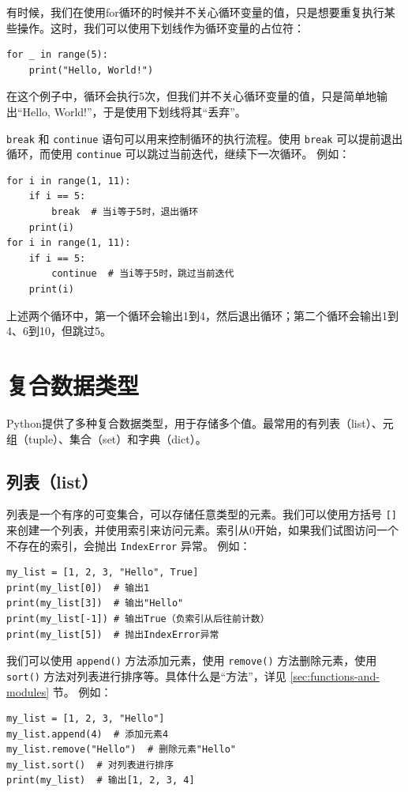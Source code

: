 有时候，我们在使用for循环的时候并不关心循环变量的值，只是想要重复执行某些操作。这时，我们可以使用下划线作为循环变量的占位符：
\begin{verbatim}
for _ in range(5):
    print("Hello, World!")
\end{verbatim}
在这个例子中，循环会执行5次，但我们并不关心循环变量的值，只是简单地输出“Hello, World!”，于是使用下划线将其“丢弃”。

 \texttt{break} 和 \texttt{continue} 语句可以用来控制循环的执行流程。使用 \texttt{break} 可以提前退出循环，而使用 \texttt{continue} 可以跳过当前迭代，继续下一次循环。
例如：
\begin{verbatim}
for i in range(1, 11):
    if i == 5:
        break  # 当i等于5时，退出循环
    print(i)
for i in range(1, 11):
    if i == 5:
        continue  # 当i等于5时，跳过当前迭代
    print(i)
\end{verbatim}
上述两个循环中，第一个循环会输出1到4，然后退出循环；第二个循环会输出1到4、6到10，但跳过5。

\section{复合数据类型}

Python提供了多种复合数据类型，用于存储多个值。最常用的有列表（list）、元组（tuple）、集合（set）和字典（dict）。

\subsection{列表（list）}
列表是一个有序的可变集合，可以存储任意类型的元素。我们可以使用方括号 \texttt{[]} 来创建一个列表，并使用索引来访问元素。索引从0开始，如果我们试图访问一个不存在的索引，会抛出 \texttt{IndexError} 异常。
例如：
\begin{verbatim}
my_list = [1, 2, 3, "Hello", True]
print(my_list[0])  # 输出1
print(my_list[3])  # 输出"Hello"
print(my_list[-1]) # 输出True（负索引从后往前计数）
print(my_list[5])  # 抛出IndexError异常
\end{verbatim}

我们可以使用 \texttt{append()} 方法添加元素，使用 \texttt{remove()} 方法删除元素，使用 \texttt{sort()} 方法对列表进行排序等。具体什么是“方法”，详见 \ref{sec:functions-and-modules} 节。
例如：
\begin{verbatim}
my_list = [1, 2, 3, "Hello"]
my_list.append(4)  # 添加元素4
my_list.remove("Hello")  # 删除元素"Hello"
my_list.sort()  # 对列表进行排序
print(my_list)  # 输出[1, 2, 3, 4]
\end{verbatim}

